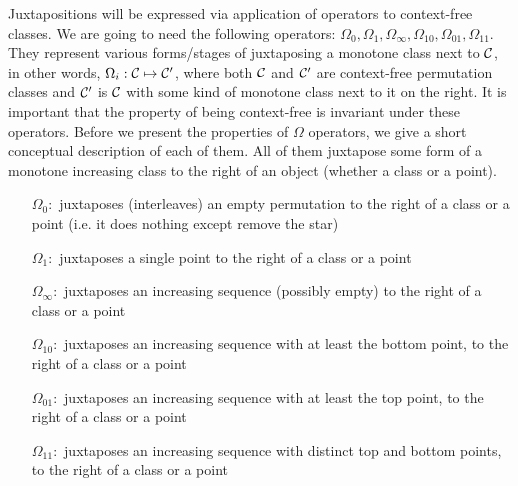 \documentclass[12pt, a4paper, twoside]{report}
\begin{document}

Juxtapositions will be expressed via application of operators to context-free classes. We are going to need the following operators: $\Omega_0, \Omega_1, \Omega_\infty, \Omega_{10}, \Omega_{01}, \Omega_{11}$. They represent various forms/stages of juxtaposing a monotone class next to $\mathcal{C}$, in other words, $\Omega_i: \mathcal{C} \mapsto \mathcal{C}'$, where both $\mathcal{C}$ and $\mathcal{C}'$ are context-free permutation classes and $\mathcal{C}'$ is $\mathcal{C}$ with some kind of monotone class next to it on the right. It is important that the property of being context-free is invariant under these operators. Before we present the properties of $\Omega$ operators, we give a short conceptual description of each of them. All of them juxtapose some form of a monotone increasing class to the right of an object (whether a class or a point).
\begin{itemize}
\item[$\Omega_0:$] juxtaposes (interleaves) an empty permutation to the right of a class or a point (i.e. it does nothing except remove the star)
\item[$\Omega_1:$] juxtaposes a single point to the right of a class or a point
\item[$\Omega_\infty:$] juxtaposes an increasing sequence (possibly empty) to the right of a class or a point
\item[$\Omega_{10}:$] juxtaposes an increasing sequence with at least the bottom point, to the right of a class or a point
\item[$\Omega_{01}:$] juxtaposes an increasing sequence with at least the top point, to the right of a class or a point
\item[$\Omega_{11}:$] juxtaposes an increasing sequence with distinct top and bottom points, to the right of a class or a point
\end{itemize}
\end{document}
